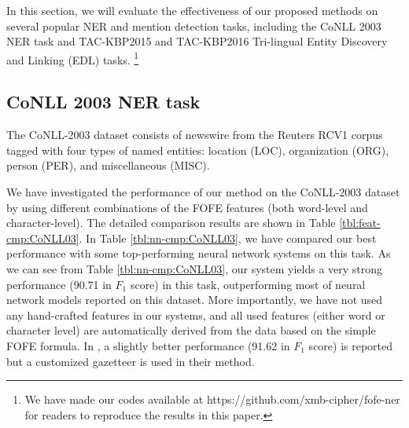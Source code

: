 \documentclass[11pt,a4paper]{article}
\begin{document}
In this section, we will evaluate the effectiveness of our proposed methods on several popular NER and mention detection tasks, including the CoNLL 2003 NER task and 
TAC-KBP2015 and TAC-KBP2016 Tri-lingual Entity Discovery and Linking (EDL) tasks.
\footnote{We have made our codes available at https://github.com/xmb-cipher/fofe-ner for readers to reproduce the results in this paper.}

\subsection{CoNLL 2003 NER task}

The CoNLL-2003 dataset \cite{tjong2003introduction} consists of newswire from the Reuters RCV1 corpus tagged with four types of named entities: location (LOC), organization (ORG), person (PER), and miscellaneous (MISC).

We have investigated the performance of our method on the CoNLL-2003 dataset by using different combinations of the FOFE features (both word-level and character-level). The detailed comparison results are shown in Table \ref{tbl:feat-cmp:CoNLL03}.  In Table \ref{tbl:nn-cmp:CoNLL03}, we have compared our best performance with some top-performing neural network systems on this task. As we can see from  Table \ref{tbl:nn-cmp:CoNLL03}, our system yields a very strong performance (90.71 in $F_1$ score) in this task, outperforming most of neural network models reported on this dataset. More importantly, we have not used any hand-crafted features in our systems, and all used features (either word or character level) are automatically derived from the data based on the simple FOFE formula. 
In \cite{chiu2016named}, a slightly better performance (91.62 in $F_1$ score) is reported but a customized gazetteer is used in their method.
\end{document}
